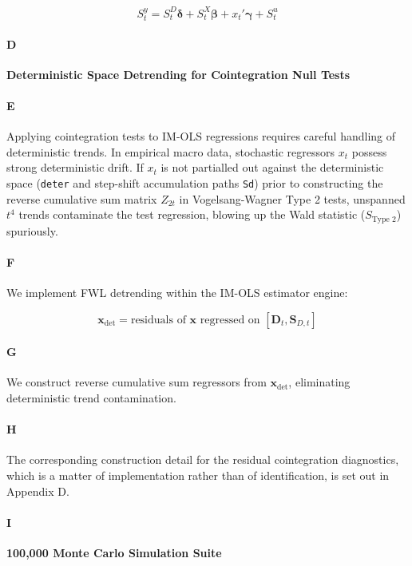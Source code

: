 \[S_t^y = S_t^D \boldsymbol{\delta} + S_t^X \boldsymbol{\beta} + x_t' \boldsymbol{\gamma} + S_t^u\]

\paragraph{D}
\textbf{Deterministic Space Detrending for Cointegration Null Tests}

\paragraph{E}
Applying cointegration tests to IM-OLS regressions requires careful handling of deterministic trends. In empirical macro data, stochastic regressors $x_t$ possess strong deterministic drift. If $x_t$ is not partialled out against the deterministic space (\texttt{deter} and step-shift accumulation paths \texttt{Sd}) prior to constructing the reverse cumulative sum matrix $Z_{2t}$ in Vogelsang-Wagner Type 2 tests, unspanned $t^4$ trends contaminate the test regression, blowing up the Wald statistic ($S_{\text{Type 2}}$) spuriously.

\paragraph{F}
We implement FWL detrending within the IM-OLS estimator engine:

\[\mathbf{x}_{\text{det}} = \text{residuals of } \mathbf{x} \text{ regressed on } [\mathbf{D}_t, \mathbf{S}_{D,t}]\]

\paragraph{G}
We construct reverse cumulative sum regressors from $\mathbf{x}_{\text{det}}$, eliminating deterministic trend contamination.

\paragraph{H}
The corresponding construction detail for the residual cointegration diagnostics, which is a matter of implementation rather than of identification, is set out in Appendix D.

\paragraph{I}
\textbf{100,000 Monte Carlo Simulation Suite}

